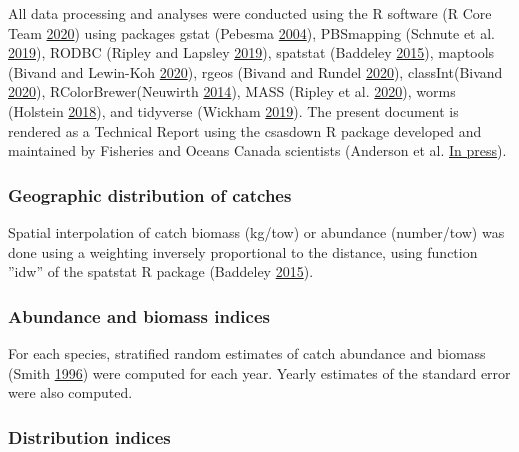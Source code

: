 \documentclass[12pt]{article}\usepackage[]{graphicx}\usepackage[]{color}
\begin{document}
All data processing and analyses were conducted using the R software (R Core Team \protect\hyperlink{ref-R:2020}{2020}) using packages gstat (Pebesma \protect\hyperlink{ref-R:package:gstat}{2004}), PBSmapping (Schnute et al. \protect\hyperlink{ref-R:package:PBSmapping}{2019}), RODBC (Ripley and Lapsley \protect\hyperlink{ref-R:package:RODBC}{2019}), spatstat (Baddeley \protect\hyperlink{ref-R:package:spatstat}{2015}), maptools (Bivand and Lewin-Koh \protect\hyperlink{ref-R:package:maptools}{2020}), rgeos (Bivand and Rundel \protect\hyperlink{ref-R:package:rgeos}{2020}), classInt(Bivand \protect\hyperlink{ref-R:package:classInt}{2020}), RColorBrewer(Neuwirth \protect\hyperlink{ref-R:package:RColorBrewer}{2014}), MASS (Ripley et al. \protect\hyperlink{ref-R:package:MASS}{2020}), worms (Holstein \protect\hyperlink{ref-R:package:worms}{2018}), and tidyverse (Wickham \protect\hyperlink{ref-R:Tidyverse}{2019}). The present document is rendered as a Technical Report using the csasdown R package developed and maintained by Fisheries and Oceans Canada scientists (Anderson et al. \protect\hyperlink{ref-R:csasdown}{In press}).

\hypertarget{geographic-distribution-of-catches}{%
\subsubsection{Geographic distribution of catches}\label{geographic-distribution-of-catches}}

Spatial interpolation of catch biomass (kg/tow) or abundance (number/tow) was done using a weighting inversely proportional to the distance, using function ''idw'' of the spatstat R package (Baddeley \protect\hyperlink{ref-R:package:spatstat}{2015}).

\hypertarget{abundance-and-biomass-indices}{%
\subsubsection{Abundance and biomass indices}\label{abundance-and-biomass-indices}}

For each species, stratified random estimates of catch abundance and biomass (Smith \protect\hyperlink{ref-Smith:1996}{1996}) were computed for each year. Yearly estimates of the standard error were also computed.

\hypertarget{distribution-indices}{%
\subsubsection{Distribution indices}\label{distribution-indices}}
\end{document}

